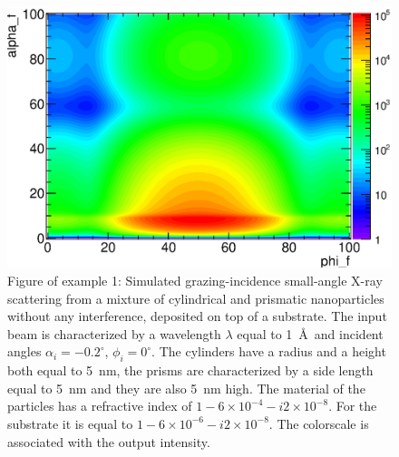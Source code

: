\begin{figure}[h]
  \begin{center}
   \includegraphics[clip=true, width=120mm]{Manual_ex1.eps}
  \end{center}
  \caption[Example 1: Simulated grazing-incidence small-angle X-ray scattering from a mixture of
cylindrical and prismatic nanoparticles without any interference, deposited on top
of a substrate]{Figure of example 1: Simulated grazing-incidence small-angle X-ray scattering from a mixture of
cylindrical and prismatic nanoparticles without any interference, deposited on top
of a substrate. The input beam is characterized by a wavelength
$\lambda$ equal to 1~\AA\ and incident angles $\alpha_i=-0.2^{\circ}$, $\phi_i=0^{\circ}$. The
cylinders have a radius and a height both equal to 5~nm, the prisms
are characterized by a side length equal to 5~nm and they are also 5~nm high. The
material of the particles has a refractive index of $1-6\times 10^{-4}-i2\times 10^{-8}$. For the substrate
it is equal to $1-6\times 10^{-6} -i2\times 10^{-8} $. The colorscale
is associated with the output intensity. }
\label{fig:output_ex1}
\end{figure}

\newpage
    
